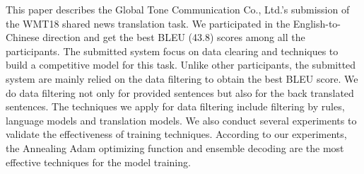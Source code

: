 This paper describes the Global Tone Communication Co., Ltd.'s submission of the WMT18 shared news translation task. We participated in the English-to-Chinese direction and get the best BLEU (43.8) scores among all the participants. The submitted system focus on data clearing and techniques to build a competitive model for this task. Unlike other participants, the submitted system are mainly relied on the data filtering to obtain the best BLEU score. We do data filtering not only for provided sentences but also for the back translated sentences. The techniques we apply for data filtering include filtering by rules, language models and translation models. We also conduct several experiments to validate the effectiveness of training techniques. According to our experiments, the Annealing Adam optimizing function and ensemble decoding are the most effective techniques for the model training.
